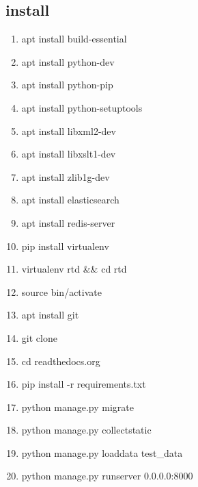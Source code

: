 \documentclass[a4paper,10pt,english]{sphinxmanual}
\begin{document}
\subsection{install}
\label{\detokenize{intro:install}}\begin{enumerate}
\item {} 
apt install build-essential

\item {} 
apt install python-dev

\item {} 
apt install python-pip

\item {} 
apt install python-setuptools

\item {} 
apt install libxml2-dev

\item {} 
apt install libxslt1-dev

\item {} 
apt install zlib1g-dev

\item {} 
apt install elasticsearch

\item {} 
apt install redis-server

\item {} 
pip install virtualenv

\item {} 
virtualenv rtd \&\& cd rtd

\item {} 
source bin/activate

\item {} 
apt install git

\item {} 
git clone 

\item {} 
cd readthedocs.org

\item {} 
pip install -r requirements.txt

\item {} 
python manage.py migrate

\item {} 
python manage.py collectstatic

\item {} 
python manage.py loaddata test\_data

\item {} 
python manage.py runserver 0.0.0.0:8000


\end{enumerate}
\end{document}
